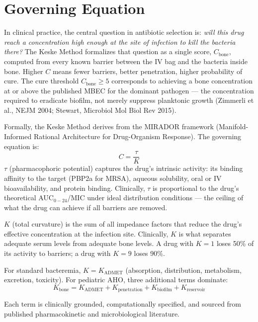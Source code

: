 \documentclass[11pt]{article}
\begin{document}
\section{Governing Equation}

In clinical practice, the central question in antibiotic selection is:
\textit{will this drug reach a concentration high enough at the site of infection
to kill the bacteria there?} The Keske Method formalizes that question as a
single score, $C_{\text{bone}}$, computed from every known barrier between the
IV bag and the bacteria inside bone. Higher $C$ means fewer barriers, better
penetration, higher probability of cure. The cure threshold $C_{\text{bone}} \geq 5$
corresponds to achieving a bone concentration at or above the published MBEC
for the dominant pathogen — the concentration required to eradicate biofilm,
not merely suppress planktonic growth (Zimmerli et al., NEJM 2004;
Stewart, Microbiol Mol Biol Rev 2015).

Formally, the Keske Method derives from the MIRADOR framework (Manifold-Informed
Rational Architecture for Drug-Organism Response). The governing equation is:
\[
  C = \frac{\tau}{K}
\]
$\tau$ (pharmacophoric potential) captures the drug's intrinsic activity: its
binding affinity to the target (PBP2a for MRSA), aqueous solubility, oral or
IV bioavailability, and protein binding. Clinically, $\tau$ is proportional to
the drug's theoretical AUC$_{0-24}$/MIC under ideal distribution conditions —
the ceiling of what the drug can achieve if all barriers are removed.

$K$ (total curvature) is the sum of all impedance factors that reduce the drug's
effective concentration at the infection site. Clinically, $K$ is what separates
adequate serum levels from adequate bone levels. A drug with $K = 1$ loses
50\% of its activity to barriers; a drug with $K = 9$ loses 90\%.

For standard bacteremia, $K = K_{\text{ADMET}}$ (absorption, distribution,
metabolism, excretion, toxicity). For pediatric AHO, three additional terms
dominate:
\[
  \boxed{K_{\text{bone}} = K_{\text{ADMET}} + K_{\text{penetration}} + K_{\text{biofilm}} + K_{\text{reservoir}}}
\]

Each term is clinically grounded, computationally specified, and sourced from
published pharmacokinetic and microbiological literature.

\end{document}
